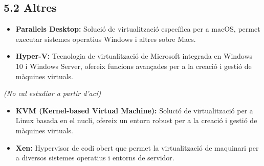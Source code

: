 \documentclass[
  12 pt,
  a4paper,
]{article}
\providecommand{\tightlist}{%
  \setlength{\itemsep}{0pt}\setlength{\parskip}{0pt}}
\begin{document}
\subsection{5.2 Altres}\label{altres-1}

\begin{itemize}
\tightlist
\item
  \textbf{Parallels Desktop:} Solució de virtualització específica per a
  macOS, permet executar sistemes operatius Windows i altres sobre Macs.
\item
  \textbf{Hyper-V:} Tecnologia de virtualització de Microsoft integrada
  en Windows 10 i Windows Server, ofereix funcions avançades per a la
  creació i gestió de màquines virtuals.
\end{itemize}

\emph{(No cal estudiar a partir d'ací)}

\begin{itemize}
\tightlist
\item
  \textbf{KVM (Kernel-based Virtual Machine):} Solució de virtualització
  per a Linux basada en el nucli, ofereix un entorn robust per a la
  creació i gestió de màquines virtuals.
\item
  \textbf{Xen:} Hypervisor de codi obert que permet la virtualització de
  maquinari per a diversos sistemes operatius i entorns de servidor.
\end{itemize}
\end{document}
